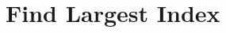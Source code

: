 \documentclass[11pt]{article}
\begin{document}
\section{Find Largest Index}%








































































\end{document}
